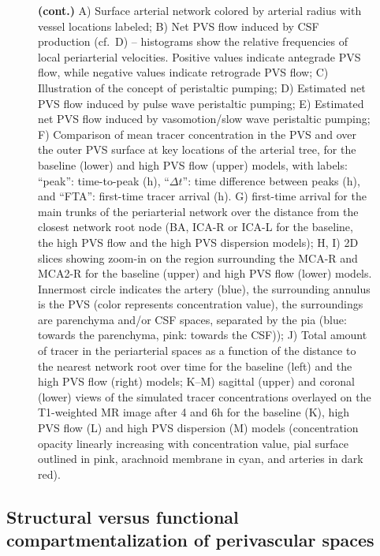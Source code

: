 \documentclass[fleqn,10pt]{wlscirep}
\begin{document}
\begin{figure}
\ContinuedFloat
  \caption{\textbf{(cont.)}
    A) Surface arterial network colored by arterial radius with vessel locations labeled;
    B) Net PVS flow induced by CSF production (cf.~D) -- histograms show the relative frequencies of local periarterial velocities. Positive values indicate antegrade PVS flow, while negative values indicate retrograde PVS flow;
    C) Illustration of the concept of peristaltic pumping;
    D) Estimated net PVS flow induced by pulse wave peristaltic pumping;
    E) Estimated net PVS flow induced by vasomotion/slow wave peristaltic pumping;
    F) Comparison of mean tracer concentration in the PVS and over the outer PVS surface at key locations of the arterial tree, for the baseline (lower) and high PVS flow (upper) models, with labels: ``peak'': time-to-peak (h), ``$\Delta t$'': time difference between peaks (h), and ``FTA'': first-time tracer arrival (h).
    G) first-time arrival for the main trunks of the periarterial network over the distance from the closest network root node (BA, ICA-R or ICA-L for the baseline, the high PVS flow and the high PVS dispersion models);
    H, I) 2D slices showing zoom-in on the region surrounding the MCA-R and MCA2-R for the baseline (upper) and high PVS flow (lower) models. Innermost circle indicates the artery (blue), the surrounding annulus is the PVS (color represents concentration value), the surroundings are parenchyma and/or CSF spaces, separated by the pia (blue: towards the parenchyma, pink: towards the CSF));
    J) Total amount of tracer in the periarterial spaces as a function of the distance to the nearest network root over time for the baseline (left) and the high PVS flow (right) models;
    K--M) sagittal (upper) and coronal (lower) views of the simulated tracer concentrations overlayed on the T1-weighted MR image after 4 and 6h for the baseline (K), high PVS flow (L) and high PVS dispersion (M) models (concentration opacity linearly increasing with concentration value, pial surface outlined in pink, arachnoid membrane in cyan, and arteries in dark red).}
\end{figure}

\subsection*{Structural versus functional compartmentalization of perivascular spaces}
\end{document}
